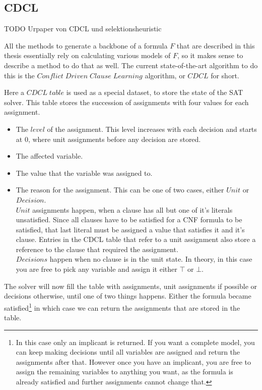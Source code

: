 \subsection{CDCL}

TODO Urpaper von CDCL und selektionsheuristic

All the methods to generate a backbone of a formula $F$ that are described in this thesis essentially rely on calculating various models of $F$, so it makes sense to describe a method to do that as well. The current state-of-the-art algorithm to do this is the $Conflict\;Driven\;Clause\;Learning$ algorithm, or $CDCL$ for short. 

Here a $CDCL\;table$ is used as a special dataset, to store the state of the SAT solver. This table stores the succession of assignments with four values for each assignment.
\begin{itemize}
\item The $level$ of the assignment. This level increases with each decision and starts at 0, where unit assignments before any decision are stored.
\item The affected variable.
\item The value that the variable was assigned to.
\item The reason for the assignment. This can be one of two cases, either $Unit$ or $Decision$. 
\\
$Unit$ assignments happen, when a clause has all but one of it's literals unsatisfied. Since all clauses have to be satisfied for a CNF formula to be satisfied, that last literal must be assigned a value that satisfies it and it's clause. Entries in the CDCL table that refer to a unit assignment also store a reference to the clause that required the assignment.
\\
$Decisions$ happen when no clause is in the unit state. In theory, in this case you are free to pick any variable and assign it either $\top$ or $\bot$. 
\end{itemize}

The solver will now fill the table with assignments, unit assignments if possible or decisions otherwise, until one of two things happens. Either the formula became satisfied\footnote{
	In this case only an implicant is returned. If you want a complete model, you can keep making decisions until all variables are assigned and return the assignments after that. However once you have an implicant, you are free to assign the remaining variables to anything you want, as the formula is already satisfied and further assignments cannot change that.}
 in which case we can return the assignments that are stored in the table.

